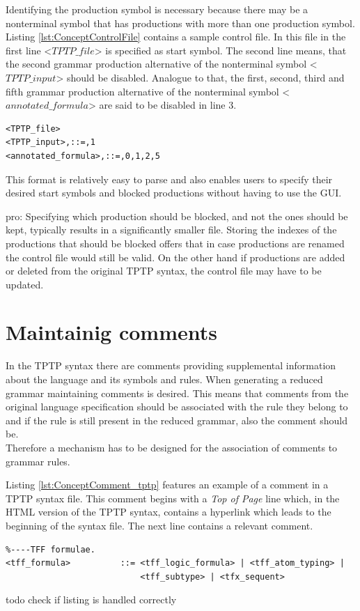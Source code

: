 Identifying the production symbol is necessary because there may be a nonterminal symbol that has productions with more than one production symbol.\\
Listing \ref{lst:ConceptControlFile} contains a sample control file. In this file in the first line <$TPTP\_file$> is specified as start symbol.
The second line means, that the second grammar production alternative of the nonterminal symbol <$TPTP\_input$> should be disabled.
Analogue to that, the first, second, third and fifth grammar production alternative of the nonterminal symbol <$annotated\_formula$> are said to be disabled in line 3.

\begin{lstlisting}[caption= Control file,label= lst:ConceptControlFile]
<TPTP_file>
<TPTP_input>,::=,1
<annotated_formula>,::=,0,1,2,5
\end{lstlisting}
This format is relatively easy to parse and also enables users to specify their desired start symbols and blocked productions without having to use the GUI.

pro: Specifying which production should be blocked, and not the ones should be kept, typically results in a significantly smaller file.
Storing the indexes of the productions that should be blocked offers that in case productions are renamed the control file would still be valid. On the other hand if productions are added or deleted from the original \ac{TPTP} syntax, the control file may have to be updated.

\section{Maintainig comments}\label{sec:ConceptMaintainingComments}
In the \ac{TPTP} syntax there are comments providing supplemental information about the language and its symbols and rules.
When generating a reduced grammar maintaining comments is desired. This means that comments from the original language specification should be associated with the rule they belong to and if the rule is still present in the reduced grammar, also the comment should be.\\
Therefore a mechanism has to be designed for the association of comments to grammar rules.

Listing \ref{lst:ConceptComment_tptp} features an example of a comment in a \ac{TPTP} syntax file. This comment begins with a \textit{Top of Page} line which, in the HTML version of the \ac{TPTP} syntax, contains a hyperlink which leads to the beginning of the syntax file.
The next line contains a relevant comment.\\
\begin{lstlisting}[language=none, basicstyle=\scriptsize	,caption= Comment in the \ac{TPTP} syntax,label= lst:ConceptComment_tptp]
%----Top of Page---------------------------------------------------------------
%----TFF formulae.
<tff_formula>          ::= <tff_logic_formula> | <tff_atom_typing> |
                           <tff_subtype> | <tfx_sequent>
\end{lstlisting}
todo check if listing is handled correctly

